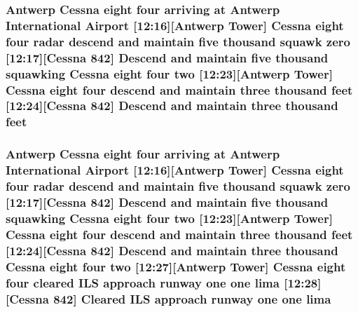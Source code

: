 \subsubsection[{\texorpdfstring{feet}{feet}}]{\setlength{\rightskip}{0pt plus 5cm}Antwerp {\bf Cessna} eight four arriving at Antwerp International {\bf Airport} \mbox{[}12\+:16\mbox{]}\mbox{[}Antwerp {\bf Tower}\mbox{]} {\bf Cessna} eight four radar descend and maintain five {\bf thousand} squawk {\bf zero} \mbox{[}12\+:17\mbox{]}\mbox{[}{\bf Cessna} 842\mbox{]} Descend and maintain five {\bf thousand} {\bf squawking} {\bf Cessna} eight four {\bf two} \mbox{[}12\+:23\mbox{]}\mbox{[}Antwerp {\bf Tower}\mbox{]} {\bf Cessna} eight four descend and maintain three {\bf thousand} feet \mbox{[}12\+:24\mbox{]}\mbox{[}{\bf Cessna} 842\mbox{]} Descend and maintain three {\bf thousand} feet}\hypertarget{happyDay2ATC_8txt_adb5a296986a5b6019ec88f520f243c26}{}\label{happyDay2ATC_8txt_adb5a296986a5b6019ec88f520f243c26}
\subsubsection[{\texorpdfstring{lima}{lima}}]{\setlength{\rightskip}{0pt plus 5cm}Antwerp {\bf Cessna} eight four arriving at Antwerp International {\bf Airport} \mbox{[}12\+:16\mbox{]}\mbox{[}Antwerp {\bf Tower}\mbox{]} {\bf Cessna} eight four radar descend and maintain five {\bf thousand} squawk {\bf zero} \mbox{[}12\+:17\mbox{]}\mbox{[}{\bf Cessna} 842\mbox{]} Descend and maintain five {\bf thousand} {\bf squawking} {\bf Cessna} eight four {\bf two} \mbox{[}12\+:23\mbox{]}\mbox{[}Antwerp {\bf Tower}\mbox{]} {\bf Cessna} eight four descend and maintain three {\bf thousand} {\bf feet} \mbox{[}12\+:24\mbox{]}\mbox{[}{\bf Cessna} 842\mbox{]} Descend and maintain three {\bf thousand} {\bf Cessna} eight four {\bf two} \mbox{[}12\+:27\mbox{]}\mbox{[}Antwerp {\bf Tower}\mbox{]} {\bf Cessna} eight four cleared I\+LS approach runway {\bf one} {\bf one} lima \mbox{[}12\+:28\mbox{]}\mbox{[}{\bf Cessna} 842\mbox{]} Cleared I\+LS approach runway {\bf one} {\bf one} lima}\hypertarget{happyDay2ATC_8txt_a7b00d28574232f99d7aa26b480b68bc4}{}\label{happyDay2ATC_8txt_a7b00d28574232f99d7aa26b480b68bc4}
